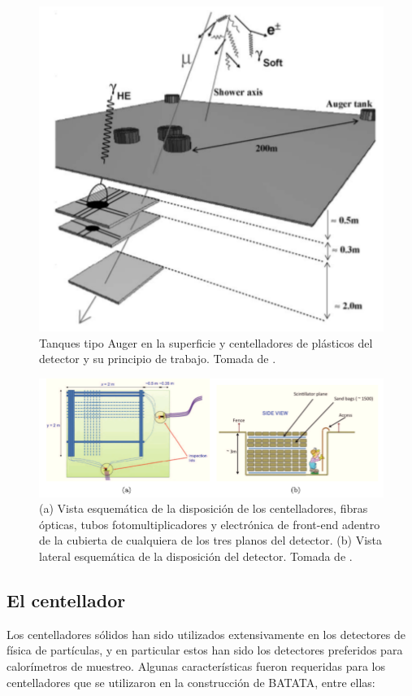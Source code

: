 \documentclass[a4paper,10pt]{article}
\numberwithin{equation}{section}
\begin{document}
\begin{figure}[H]
 \center 
 \includegraphics[scale=0.5]{fig1}
 \caption{Tanques tipo Auger en la superficie y centelladores de plásticos del 
 detector y su principio de trabajo. Tomada de \cite{alfaro}.}
\end{figure}

\begin{figure}[H]
 \center 
 \includegraphics[scale=0.46]{fig2}
 \caption{(a) Vista esquemática de la disposición de los centelladores, 
 fibras ópticas, tubos fotomultiplicadores y electrónica de front-end adentro 
 de la cubierta de cualquiera de los tres planos del detector. (b) Vista lateral 
 esquemática de la disposición del detector. Tomada de \cite{trovato}.}
\end{figure}

\subsection{El centellador}

Los centelladores sólidos han sido utilizados extensivamente en los detectores 
de física de partículas, y en particular estos han sido los detectores preferidos 
para calorímetros de muestreo. Algunas características fueron requeridas para 
los centelladores que se utilizaron en la construcción de BATATA, entre ellas: 
\end{document}
